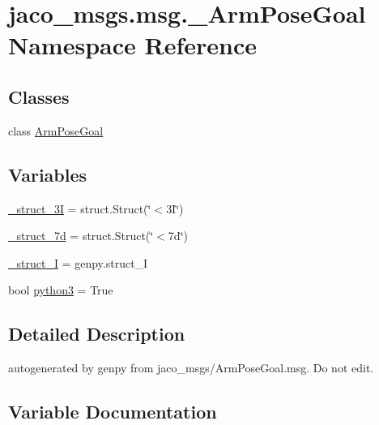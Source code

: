 \hypertarget{namespacejaco__msgs_1_1msg_1_1__ArmPoseGoal}{}\section{jaco\+\_\+msgs.\+msg.\+\_\+\+Arm\+Pose\+Goal Namespace Reference}
\label{namespacejaco__msgs_1_1msg_1_1__ArmPoseGoal}
\subsection*{Classes}
\begin{DoxyCompactItemize}
\item 
class \hyperlink{classjaco__msgs_1_1msg_1_1__ArmPoseGoal_1_1ArmPoseGoal}{Arm\+Pose\+Goal}
\end{DoxyCompactItemize}
\subsection*{Variables}
\begin{DoxyCompactItemize}
\item 
\hyperlink{namespacejaco__msgs_1_1msg_1_1__ArmPoseGoal_a1f4d3ad17579cc82a6b174aecb35eda6}{\+\_\+struct\+\_\+3I} = struct.\+Struct(\char`\"{}$<$3\+I\char`\"{})
\item 
\hyperlink{namespacejaco__msgs_1_1msg_1_1__ArmPoseGoal_a61745e7c1be1c3f625392d61289a639c}{\+\_\+struct\+\_\+7d} = struct.\+Struct(\char`\"{}$<$7d\char`\"{})
\item 
\hyperlink{namespacejaco__msgs_1_1msg_1_1__ArmPoseGoal_a226088dc549a186129ea22de76a2095b}{\+\_\+struct\+\_\+I} = genpy.\+struct\+\_\+I
\item 
bool \hyperlink{namespacejaco__msgs_1_1msg_1_1__ArmPoseGoal_a3f19285c65bbb7e585cbbd9927343926}{python3} = True
\end{DoxyCompactItemize}


\subsection{Detailed Description}
\begin{DoxyVerb}autogenerated by genpy from jaco_msgs/ArmPoseGoal.msg. Do not edit.\end{DoxyVerb}
 

\subsection{Variable Documentation}

